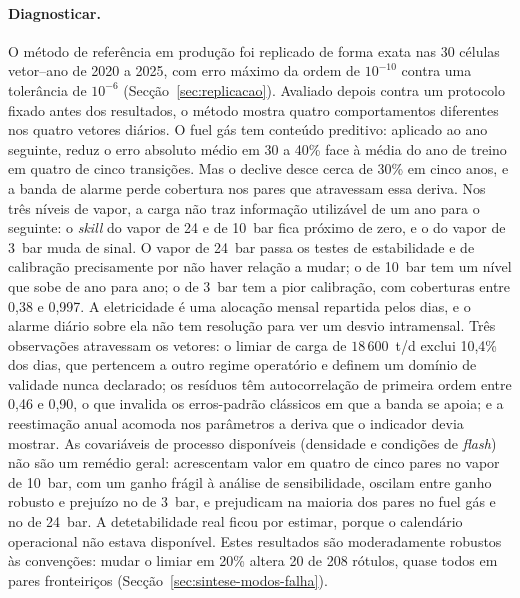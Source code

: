 \paragraph{Diagnosticar.} O método de referência em produção foi replicado
de forma exata nas 30 células vetor--ano de 2020 a 2025, com erro máximo da
ordem de $10^{-10}$ contra uma tolerância de $10^{-6}$
(Secção~\ref{sec:replicacao}). Avaliado depois contra um protocolo fixado
antes dos resultados, o método mostra quatro comportamentos diferentes nos
quatro vetores diários. O fuel gás tem conteúdo preditivo: aplicado ao ano
seguinte, reduz o erro absoluto médio em 30 a 40\% face à média do ano de
treino em quatro de cinco transições. Mas o declive desce cerca de 30\% em
cinco anos, e a banda de alarme perde cobertura nos pares que atravessam
essa deriva. Nos três níveis de vapor, a carga não traz informação
utilizável de um ano para o seguinte: o \emph{skill} do vapor de 24 e de
10~bar fica próximo de zero, e o do vapor de 3~bar muda de sinal. O vapor de
24~bar passa os testes de estabilidade e de calibração precisamente por não
haver relação a mudar; o de 10~bar tem um nível que sobe de ano para ano; o
de 3~bar tem a pior calibração, com coberturas entre 0,38 e 0,997. A
eletricidade é uma alocação mensal repartida pelos dias, e o alarme diário
sobre ela não tem resolução para ver um desvio intramensal. Três observações
atravessam os vetores: o limiar de carga de $18\,600$~t/d exclui 10,4\% dos
dias, que pertencem a outro regime operatório e definem um domínio de
validade nunca declarado; os resíduos têm autocorrelação de primeira ordem
entre 0,46 e 0,90, o que invalida os erros-padrão clássicos em que a banda
se apoia; e a reestimação anual acomoda nos parâmetros a deriva que o
indicador devia mostrar. As covariáveis de processo disponíveis (densidade e condições de
\emph{flash}) não são um remédio geral: acrescentam valor em quatro de cinco
pares no vapor de 10~bar, com um ganho frágil à análise de sensibilidade,
oscilam entre ganho robusto e prejuízo no de 3~bar, e prejudicam na maioria
dos pares no fuel gás e no de 24~bar. A detetabilidade real ficou por estimar, porque o
calendário operacional não estava disponível. Estes resultados são
moderadamente robustos às convenções: mudar o limiar em 20\% altera 20 de
208 rótulos, quase todos em pares fronteiriços
(Secção~\ref{sec:sintese-modos-falha}).

